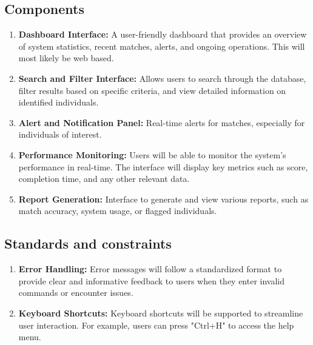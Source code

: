 \documentclass{scrreprt}
\begin{document}
        \subsection{Components}
            \begin{enumerate}
                \item \textbf{Dashboard Interface:} A user-friendly dashboard that provides an overview of system statistics, recent matches, alerts, and ongoing operations. This will most likely be web based.
                \item \textbf{Search and Filter Interface:} Allows users to search through the database, filter results based on specific criteria, and view detailed information on identified individuals.
                \item \textbf{Alert and Notification Panel:}  Real-time alerts for matches, especially for individuals of interest.
                \item \textbf{Performance Monitoring:} Users will be able to monitor the system's performance in real-time. The interface will display key metrics such as score, completion time, and any other relevant data.
                \item \textbf{Report Generation:} Interface to generate and view various reports, such as match accuracy, system usage, or flagged individuals.
            \end{enumerate}
        \subsection{Standards and constraints}
            \begin{enumerate}
                \item \textbf{Error Handling:} Error messages will follow a standardized format to provide clear and informative feedback to users when they enter invalid commands or encounter issues.
                \item \textbf{Keyboard Shortcuts:} Keyboard shortcuts will be supported to streamline user interaction. For example, users can press "Ctrl+H" to access the help menu.
            \end{enumerate}
    
\end{document}
